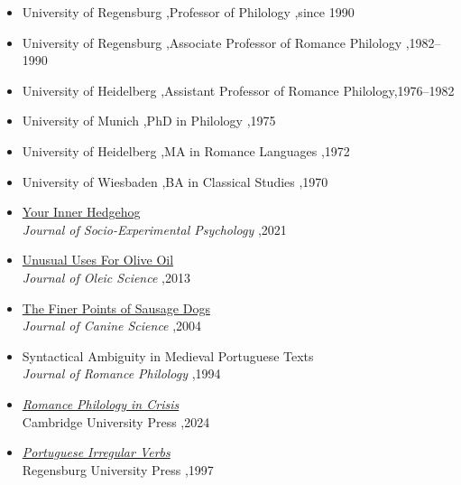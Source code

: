\documentclass[letterpaper,10pt]{article}
\begin{document}


\begin{itemize}
\item University of Regensburg \sep Professor of Philology \sep since 1990
\item University of Regensburg \sep Associate Professor of Romance Philology \sep 1982--1990
\item University of Heidelberg \sep Assistant Professor of Romance Philology\sep 1976--1982
\end{itemize}


\begin{itemize}
\item University of Munich \sep PhD in Philology \sep 1975
\item University of Heidelberg \sep MA in Romance Languages \sep 1972
\item University of Wiesbaden \sep BA in Classical Studies \sep 1970
\end{itemize}


\begin{itemize}
\item \href{https://pascalmichaillat.org/hugo-website/papers/paper3/}{Your Inner Hedgehog} \\
\textit{Journal of Socio-Experimental Psychology} \sep 2021
\item \href{https://pascalmichaillat.org/hugo-website/papers/paper1/}{Unusual Uses For Olive Oil} \\
\textit{Journal of Oleic Science} \sep 2013
\item \href{https://pascalmichaillat.org/hugo-website/papers/paper2/}{The Finer Points of Sausage Dogs} \\
\textit{Journal of Canine Science} \sep 2004
\item Syntactical Ambiguity in Medieval Portuguese Texts \\
\textit{Journal of Romance Philology} \sep 1994
\end{itemize}


\begin{itemize}
\item \href{http://www.alexandermccallsmith.com/book/portuguese-irregular-verbs}{\textit{Romance Philology in Crisis}}  \\
Cambridge University Press \sep 2024
\item \href{https://pascalmichaillat.org/hugo-website/books/book1/}{\textit{Portuguese Irregular Verbs}}\\
Regensburg University Press \sep 1997
\end{itemize}
\end{document}
